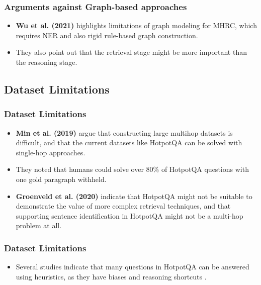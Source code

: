 \documentclass[10pt]{beamer}
\begin{document}
\begin{frame}
  \frametitle{Arguments against Graph-based approaches}
  \begin{itemize}
    \item \textbf{Wu et al. (2021)} \cite{RN106} highlights limitations of graph modeling for MHRC, which requires NER and also rigid rule-based graph construction.
    \item They also point out that the retrieval stage might be more important than the reasoning stage.
  \end{itemize}

\end{frame}

\subsection{Dataset Limitations}

\begin{frame}
  \frametitle{Dataset Limitations}
  \begin{itemize}
    \item \textbf{Min et al. (2019)} \cite{RN150} argue that constructing large multihop datasets is difficult, and that the current datasets like HotpotQA can be solved with single-hop approaches.
    \item They noted that humans could solve over 80\% of HotpotQA questions with one gold paragraph withheld.
    \item \textbf{Groenveld et al. (2020)} indicate that HotpotQA might not be suitable to demonstrate the value of more complex retrieval techniques, and that supporting sentence identification in HotpotQA might not be a multi-hop problem at all.
  \end{itemize}
  
\end{frame}

\begin{frame}
  \frametitle{Dataset Limitations}
  \begin{itemize}
    \item Several studies \cite{RN154} \cite{RN176} \cite{RN150} \cite{RN175} indicate that many questions in HotpotQA can be answered using heuristics, 
    as they have biases and reasoning shortcuts \cite{RN177}.
  \end{itemize}
  
\end{frame}

\end{document}

